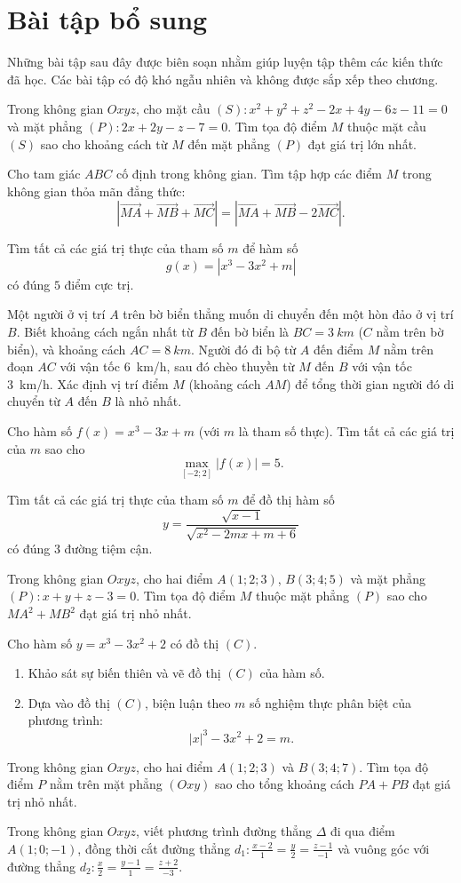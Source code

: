 \chapter{Bài tập bổ sung}
Những bài tập sau đây được biên soạn nhằm giúp luyện tập thêm các kiến thức đã học. Các bài tập có độ khó ngẫu nhiên và không được sắp xếp theo chương.

\exerciseExtra Trong không gian $Oxyz$, cho mặt cầu $(S): x^2 + y^2 + z^2 - 2x + 4y - 6z - 11 = 0$ và mặt phẳng $(P): 2x + 2y - z - 7 = 0$. Tìm tọa độ điểm $M$ thuộc mặt cầu $(S)$ sao cho khoảng cách từ $M$ đến mặt phẳng $(P)$ đạt giá trị lớn nhất.

\exerciseExtra Cho tam giác $ABC$ cố định trong không gian. Tìm tập hợp các điểm $M$ trong không gian thỏa mãn đẳng thức:
$$\left| \overrightarrow{MA} + \overrightarrow{MB} + \overrightarrow{MC} \right| = \left| \overrightarrow{MA} + \overrightarrow{MB} - 2\overrightarrow{MC} \right|.$$

\exerciseExtra Tìm tất cả các giá trị thực của tham số $m$ để hàm số
$$g(x) = \left|x^3 - 3x^2 + m\right|$$
có đúng $5$ điểm cực trị.

\exerciseExtra Một người ở vị trí $A$ trên bờ biển thẳng muốn di chuyển đến một hòn đảo ở vị trí $B$. Biết khoảng cách ngắn nhất từ $B$ đến bờ biển là $BC = \qty{3}{km}$ ($C$ nằm trên bờ biển), và khoảng cách $AC = \qty{8}{km}$. Người đó đi bộ từ $A$ đến điểm $M$ nằm trên đoạn $AC$ với vận tốc \qty{6}{km/h}, sau đó chèo thuyền từ $M$ đến $B$ với vận tốc \qty{3}{km/h}. Xác định vị trí điểm $M$ (khoảng cách $AM$) để tổng thời gian người đó di chuyển từ $A$ đến $B$ là nhỏ nhất.

\exerciseExtra Cho hàm số $f(x) = x^3 - 3x + m$ (với $m$ là tham số thực). Tìm tất cả các giá trị của $m$ sao cho
$$\max_{[-2; 2]} |f(x)| = 5.$$

\exerciseExtra Tìm tất cả các giá trị thực của tham số $m$ để đồ thị hàm số
$$y = \frac{\sqrt{x - 1}}{\sqrt{x^2 - 2mx + m + 6}}$$
có đúng $3$ đường tiệm cận.

\exerciseExtra Trong không gian $Oxyz$, cho hai điểm $A(1; 2; 3)$, $B(3; 4; 5)$ và mặt phẳng $(P): x + y + z - 3 = 0$. Tìm tọa độ điểm $M$ thuộc mặt phẳng $(P)$ sao cho $MA^2 + MB^2$ đạt giá trị nhỏ nhất.

\exerciseExtra Cho hàm số $y = x^3 - 3x^2 + 2$ có đồ thị $(C)$.
\begin{enumerate}
   \item Khảo sát sự biến thiên và vẽ đồ thị $(C)$ của hàm số.
   \item Dựa vào đồ thị $(C)$, biện luận theo $m$ số nghiệm thực phân biệt của phương trình:
   $$|x|^3 - 3x^2 + 2 = m.$$
\end{enumerate}

\exerciseExtra Trong không gian $Oxyz$, cho hai điểm $A(1; 2; 3)$ và $B(3; 4; 7)$. Tìm tọa độ điểm $P$ nằm trên mặt phẳng $(Oxy)$ sao cho tổng khoảng cách $PA + PB$ đạt giá trị nhỏ nhất.

\exerciseExtra Trong không gian $Oxyz$, viết phương trình đường thẳng $\Delta$ đi qua điểm $A(1; 0; -1)$, đồng thời cắt đường thẳng $d_1: \frac{x - 2}{1} = \frac{y}{2} = \frac{z - 1}{-1}$ và vuông góc với đường thẳng $d_2: \frac{x}{2} = \frac{y - 1}{1} = \frac{z + 2}{-3}$.

